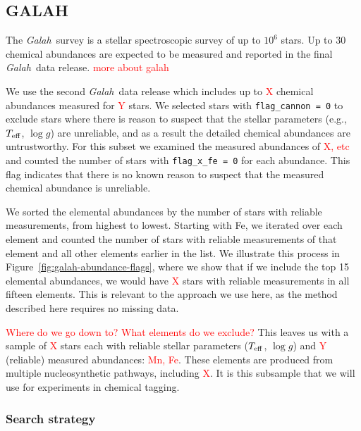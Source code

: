 \documentclass[twocolumn]{aastex61}
\newcommand\teff{T_{\rm eff}}
\newcommand\logg{\log{g}}
\newcommand{\project}[1]{\textsl{#1}}
\newcommand{\Galah}{\project{Galah}}
\newcommand{\todo}[1]{\textcolor{red}{#1}}
\begin{document}



\subsection{GALAH} \label{sec:experiment-galah}

The \Galah\ survey is a stellar spectroscopic survey of up to
$10^6$ stars. Up to 30 chemical abundances are expected to be measured
and reported in the final \Galah\ data release.
\todo{more about galah}

We use the second \Galah\ data release \citep{Buder:2018a} which
includes up to \todo{X} chemical abundances measured for \todo{Y}
stars. We selected stars with \texttt{flag\_cannon = 0} to exclude
stars where there is reason to suspect that the stellar parameters
(e.g., $\teff$, $\logg$) are unreliable, and as a result the 
detailed chemical abundances are untrustworthy. For this subset
we examined the measured abundances of \todo{X, etc} and
counted the number of stars with \texttt{flag\_x\_fe = 0}
for each abundance. This flag indicates that there is no known
reason to suspect that the measured chemical abundance is
unreliable. 

We sorted the elemental abundances by the number of stars
with reliable measurements, from highest to lowest. Starting
with Fe, we iterated over each element and counted the number
of stars with reliable measurements of that element and all
other elements earlier in the list. We illustrate this process
in Figure~\ref{fig:galah-abundance-flags}, where we show that
if we include the top 15 elemental abundances, we would have
\todo{X} stars with reliable measurements in all fifteen elements.
This is relevant to the approach we use here, as the method
described here requires no missing data.

\todo{Where do we go down to? What elements do we exclude?}
This leaves us with a sample of \todo{X} stars each with
reliable stellar parameters ($\teff$, $\logg$) and 
\todo{Y} (reliable) measured abundances: \todo{Mn, Fe}.
These elements are produced from multiple nucleosynthetic
pathways, including \todo{X}. 
It is this subsample that we will use for experiments
in chemical tagging.

\subsubsection{Search strategy} \label{sec:experiment-galah-search}
\end{document}
